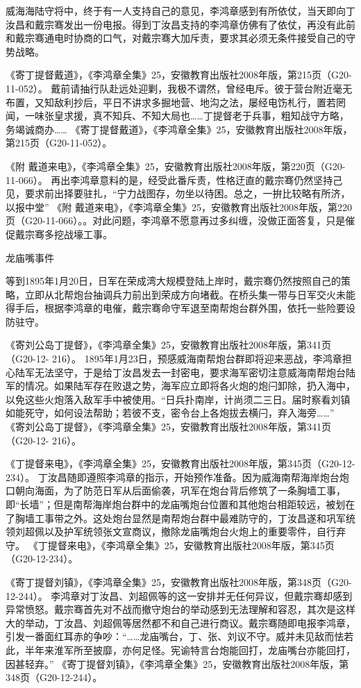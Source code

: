 \documentclass[12pt,UTF8]{ctexbook}
\begin{document}
威海海陆守将中，终于有一人支持自己的意见，李鸿章感到有所依仗，当天即向丁汝昌和戴宗骞发出一份电报。得到丁汝昌支持的李鸿章仿佛有了依仗，再没有此前和戴宗骞通电时协商的口气，对戴宗骞大加斥责，要求其必须无条件接受自己的守势战略。

《寄丁提督戴道》，《李鸿章全集》25，安徽教育出版社2008年版，第215页（G20-11-052）。
戴前请抽行队赴远处迎剿，我极不谓然，曾经电斥。彼于营台附近毫无布置，又知敌利抄后，平日不讲求多掘地营、地沟之法，屡经电饬札行，置若罔闻，一味张皇求援，真不知兵、不知大局也……丁提督老于兵事，粗知战守方略，务竭诚商办…… 《寄丁提督戴道》，《李鸿章全集》25，安徽教育出版社2008年版，第215页（G20-11-052）。

《附 戴道来电》，《李鸿章全集》25，安徽教育出版社2008年版，第220页（G20-11-066）。
再出李鸿章意料的是，经受此番斥责，性格迂直的戴宗骞仍然坚持己见，要求前出择要驻扎，“宁力战图存，勿坐以待困。总之，一拚比较略有所济，以报中堂” 《附 戴道来电》，《李鸿章全集》25，安徽教育出版社2008年版，第220页（G20-11-066）。。对此问题，李鸿章不愿意再过多纠缠，没做正面答复，只是催促戴宗骞多挖战壕工事。

龙庙嘴事件

等到1895年1月20日，日军在荣成湾大规模登陆上岸时，戴宗骞仍然按照自己的策略，立即从北帮炮台抽调兵力前出到荣成方向堵截。在桥头集一带与日军交火未能得手后，根据李鸿章的电催，戴宗骞命守军退至南帮炮台群外围，依托一些险要设防驻守。

《寄刘公岛丁提督》，《李鸿章全集》25，安徽教育出版社2008年版，第341页（G20-12- 216）。
1895年1月23日，预感威海南帮炮台群即将迎来恶战，李鸿章担心陆军无法坚守，于是给丁汝昌发去一封密电，要求海军密切注意威海南帮炮台陆军的情况。如果陆军存在败退之势，海军应立即将各火炮的炮闩卸除，扔入海中，以免这些火炮落入敌军手中被使用。“日兵扑南岸，计尚须二三日。届时察看刘镇如能死守，如何设法帮助；若彼不支，密令台上各炮拔去横闩，弃入海旁……” 《寄刘公岛丁提督》，《李鸿章全集》25，安徽教育出版社2008年版，第341页（G20-12- 216）。

《丁提督来电》，《李鸿章全集》25，安徽教育出版社2008年版，第345页（G20-12-234）。
丁汝昌随即遵照李鸿章的指示，开始预作准备。因为威海南帮海岸炮台炮口朝向海面，为了防范日军从后面偷袭，巩军在炮台背后修筑了一条胸墙工事，即“长墙”；但是南帮海岸炮台群中的龙庙嘴炮台位置和其他炮台相距较远，被划在了胸墙工事带之外。这处炮台显然是南帮炮台群中最难防守的，丁汝昌遂和巩军统领刘超佩以及护军统领张文宣商议，撤除龙庙嘴炮台火炮上的重要零件，自行弃守。 《丁提督来电》，《李鸿章全集》25，安徽教育出版社2008年版，第345页（G20-12-234）。

《寄丁提督刘镇》，《李鸿章全集》25，安徽教育出版社2008年版，第348页（G20-12-244）。
李鸿章对丁汝昌、刘超佩等的这一安排并无任何异议，但戴宗骞却感到异常愤怒。戴宗骞首先对不战而撤守炮台的举动感到无法理解和容忍，其次是这样大的举动，丁汝昌、刘超佩等居然都不和自己进行商议。戴宗骞随即电报李鸿章，引发一番面红耳赤的争吵：“……龙庙嘴台，丁、张、刘议不守。威并未见敌而怯若此，半年来淮军所至披靡，亦何足怪。宪谕特言台炮能回打，龙庙嘴台亦能回打，因甚轻弃。” 《寄丁提督刘镇》，《李鸿章全集》25，安徽教育出版社2008年版，第348页（G20-12-244）。
\end{document}
